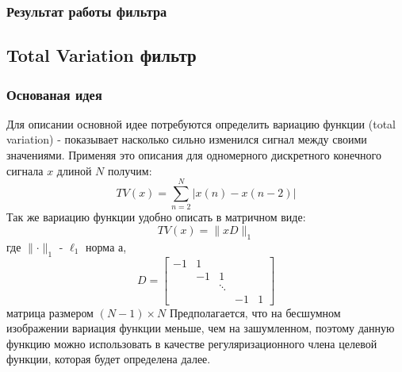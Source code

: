 \subsubsection{Результат работы фильтра}
\begin{figure}[H]\label{img:bm3d}
	\begin{minipage}[H]{0.49\linewidth}
	\end{minipage}
	\begin{minipage}[H]{0.49\linewidth}
	\end{minipage}
\end{figure}

\subsection{Total Variation фильтр}
\subsubsection{Основаная идея}
Для описании основной идее потребуются определить вариацию функции (total variation) - показывает насколько сильно изменился сигнал между своими значениями. Применяя это описания для одномерного дискретного конечного сигнала $x$ длиной $N$ получим: 
\begin{equation}\label{eq:TV}
TV(x)=\sum_{n=2}^N|x(n) - x(n-2)|
\end{equation}
Так же вариацию функции удобно описать в матричном виде:
\begin{equation}\label{eq:TV:m}
	TV(x) = \parallel xD\parallel_1
\end{equation}
где $\parallel  \cdot  \parallel_1$ - $\ell_1$  норма а,
\begin{equation}\label{eq:TV:matrix}
D = \left[
\begin{array}{ccccc}
-1 & 1 & & & \\
 & -1 &  1& & \\
 & & \ddots & & \\
 &  &  & -1  & 1 
\end{array}
\right]
\end{equation}
матрица размером $(N-1)\times N$
Предполагается, что на бесшумном изображении вариация функции меньше, чем на зашумленном, поэтому данную функцию можно использовать в качестве регуляризационного члена целевой функции, которая будет определена далее.
